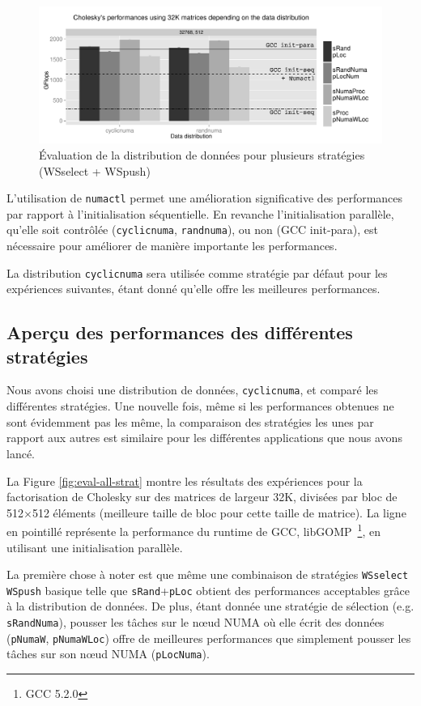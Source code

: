\documentclass[parallelisme]{compas2016}
\begin{document}
\begin{figure}[t]
  \centering
  \includegraphics[scale=0.5]{figures/graph_distrib.pdf}
  \caption{Évaluation de la distribution de données pour plusieurs stratégies (WSselect + WSpush)}
\label{fig:eval-distrib}
\end{figure}

L'utilisation de \verb/numactl/ permet une amélioration significative des performances
par rapport à l'initialisation séquentielle.
En revanche l'initialisation parallèle, qu'elle soit contrôlée (\verb/cyclicnuma/,
\verb/randnuma/), ou non (GCC init-para), est nécessaire pour améliorer de
manière importante les performances.

La distribution \verb/cyclicnuma/ sera utilisée comme stratégie par défaut pour
les expériences suivantes, étant donné qu'elle offre les meilleures performances.


\subsection{Aperçu des performances des différentes stratégies}

Nous avons choisi une distribution de données, \verb/cyclicnuma/, et comparé les
différentes stratégies.
Une nouvelle fois, même si les performances obtenues ne sont évidemment pas les
même, la comparaison des stratégies les unes par rapport aux autres est similaire
pour les différentes applications que nous avons lancé.

La Figure \ref{fig:eval-all-strat} montre les résultats des expériences pour
la factorisation de Cholesky sur des matrices de largeur 32K, divisées par
bloc de 512$\times$512 éléments (meilleure taille de bloc pour cette taille de matrice).
La ligne en pointillé représente la performance du runtime de GCC,
libGOMP~\footnote{GCC 5.2.0}, en utilisant une initialisation parallèle.

La première chose à noter est que même une combinaison de stratégies \verb/WSselect/
\verb/WSpush/ basique telle que \verb/sRand/+\verb/pLoc/ obtient des performances
acceptables grâce à la distribution de données.
De plus, étant donnée une stratégie de sélection (e.g. \verb/sRandNuma/), pousser
les tâches sur le nœud NUMA où elle écrit des données (\verb/pNumaW/, \verb/pNumaWLoc/) offre
de meilleures performances que simplement pousser les tâches sur son nœud NUMA (\verb/pLocNuma/).
\end{document}
